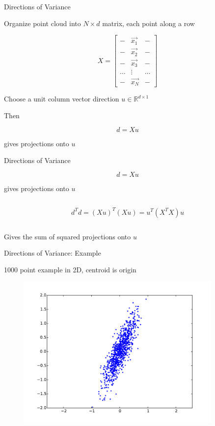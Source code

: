 \documentclass{beamer}
\begin{document}
\begin{frame}{Directions of Variance}

Organize point cloud into $N \times d$ matrix, each point along a row

\[ X = \left[ \begin{array}{ccc} - & \vec{x_1} & -  \\ - & \vec{x_2} & - \\ - & \vec{x_3} & -  \\ \hdots & \vdots & \hdots \\ - & \vec{x_N} & - \end{array} \right] \]

Choose a unit column vector direction $u \in \mathbb{R}^{d \times 1}$

Then 

\[ d = Xu \]

gives projections onto $u$

\end{frame}


\begin{frame}{Directions of Variance}

\[ d = Xu \]

gives projections onto $u$

\[ \]

\[ d^Td = (Xu)^T(Xu) = u^T (X^TX) u \]

\[ \]

Gives the sum of squared projections onto $u$

\end{frame}


\begin{frame}{Directions of Variance: Example}

1000 point example in 2D, centroid is origin

\begin{figure}[t]
    \centering
	\includegraphics[width=0.9\textwidth]{2DPCAOrig.pdf}
\end{figure}


\end{frame}
\end{document}
